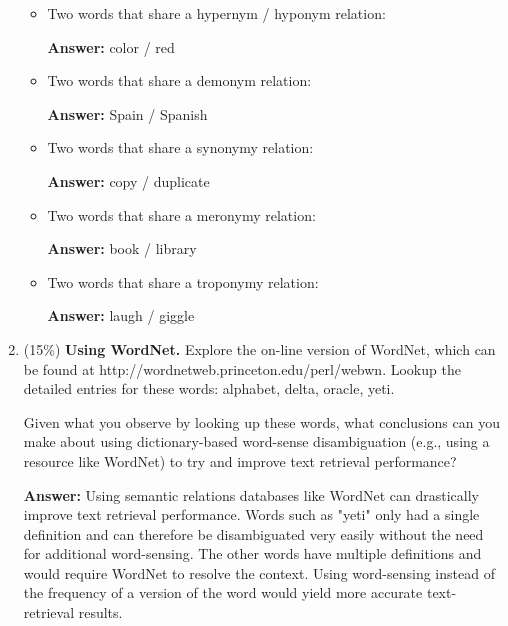 \documentclass[11pt]{article}
\begin{document}
\begin{enumerate}
            \begin{itemize}
                  \item Two words that share a hypernym / hyponym relation:

                        \textbf{Answer:} color / red

                  \item Two words that share a demonym relation:

                        \textbf{Answer:} Spain / Spanish

                  \item Two words that share a synonymy relation:

                        \textbf{Answer:} copy / duplicate

                  \item Two words that share a meronymy relation:

                        \textbf{Answer:} book / library

                  \item Two words that share a troponymy relation:

                        \textbf{Answer:} laugh / giggle

            \end{itemize}

      \item (15\%) \textbf{Using WordNet.} Explore the on-line version of WordNet, which can be found at http://wordnetweb.princeton.edu/perl/webwn. Lookup the detailed entries for these words: alphabet, delta, oracle, yeti.

            Given what you observe by looking up these words, what conclusions can you make about using dictionary-based word-sense disambiguation (e.g., using a resource like WordNet) to try and improve text retrieval performance?

            \textbf{Answer:} Using semantic relations databases like WordNet can drastically improve text retrieval performance. Words such as "yeti" only had a single definition and can therefore be disambiguated very easily without the need for additional word-sensing. The other words have multiple definitions and would require WordNet to resolve the context. Using word-sensing instead of the frequency of a version of the word would yield more accurate text-retrieval results.

\end{enumerate}
\end{document}
